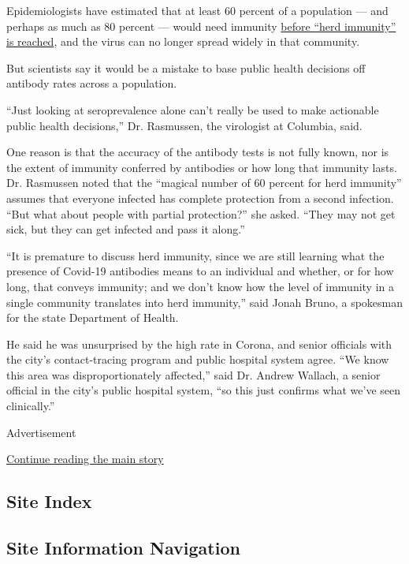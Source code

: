 Epidemiologists have estimated that at least 60 percent of a population
--- and perhaps as much as 80 percent --- would need immunity
\href{https://www.nytimes3xbfgragh.onion/interactive/2020/05/28/upshot/coronavirus-herd-immunity.html}{before
``herd immunity'' is reached}, and the virus can no longer spread widely
in that community.

But scientists say it would be a mistake to base public health decisions
off antibody rates across a population.

``Just looking at seroprevalence alone can't really be used to make
actionable public health decisions,'' Dr. Rasmussen, the virologist at
Columbia, said.

One reason is that the accuracy of the antibody tests is not fully
known, nor is the extent of immunity conferred by antibodies or how long
that immunity lasts. Dr. Rasmussen noted that the ``magical number of 60
percent for herd immunity'' assumes that everyone infected has complete
protection from a second infection. ``But what about people with partial
protection?'' she asked. ``They may not get sick, but they can get
infected and pass it along.''

``It is premature to discuss herd immunity, since we are still learning
what the presence of Covid-19 antibodies means to an individual and
whether, or for how long, that conveys immunity; and we don't know how
the level of immunity in a single community translates into herd
immunity,'' said Jonah Bruno, a spokesman for the state Department of
Health.

He said he was unsurprised by the high rate in Corona, and senior
officials with the city's contact-tracing program and public hospital
system agree. ``We know this area was disproportionately affected,''
said Dr. Andrew Wallach, a senior official in the city's public hospital
system, ``so this just confirms what we've seen clinically.''

Advertisement

\protect\hyperlink{after-bottom}{Continue reading the main story}

\hypertarget{site-index}{%
\subsection{Site Index}\label{site-index}}

\hypertarget{site-information-navigation}{%
\subsection{Site Information
Navigation}\label{site-information-navigation}}

